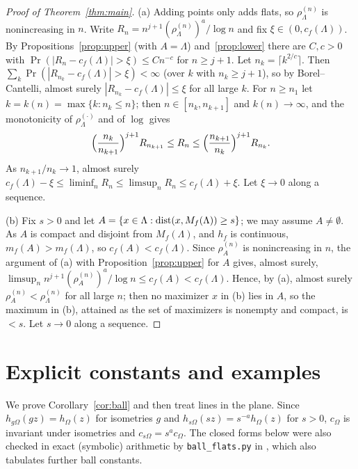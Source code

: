 \documentclass[11pt]{article}
\begin{document}
\begin{proof}[Proof of Theorem~\ref{thm:main}]
(a) Adding points only adds flats, so $\rho_\Lambda^{(n)}$ is nonincreasing in $n$. Write $R_n=n^{j+1}(\rho_\Lambda^{(n)})^a/\log n$ and fix
$\xi\in(0,c_f(\Lambda))$. By Propositions~\ref{prop:upper} (with $A=\Lambda$) and~\ref{prop:lower} there are $C,c>0$ with
$\Pr(|R_n-c_f(\Lambda)|>\xi)\le Cn^{-c}$ for $n\ge j+1$. Let $n_k=\lceil k^{2/c}\rceil$. Then $\sum_k\Pr(|R_{n_k}-c_f(\Lambda)|>\xi)<\infty$ (over
$k$ with $n_k\ge j+1$), so by Borel--Cantelli, almost surely $|R_{n_k}-c_f(\Lambda)|\le\xi$ for all large $k$. For $n\ge n_1$ let
$k=k(n)=\max\{k:n_k\le n\}$; then $n\in[n_k,n_{k+1}]$ and $k(n)\to\infty$, and the monotonicity of $\rho_\Lambda^{(\cdot)}$ and of $\log$
gives
\[
  \Bigl(\frac{n_k}{n_{k+1}}\Bigr)^{j+1}R_{n_{k+1}}\le R_n\le\Bigl(\frac{n_{k+1}}{n_k}\Bigr)^{j+1}R_{n_k}.
\]
As $n_{k+1}/n_k\to1$, almost surely $c_f(\Lambda)-\xi\le\liminf_nR_n\le\limsup_nR_n\le c_f(\Lambda)+\xi$. Let $\xi\to0$ along a sequence.

(b) Fix $s>0$ and let $A=\{x\in\Lambda:\operatorname{dist}(x,M_f(\Lambda))\ge s\}$; we may assume $A\ne\emptyset$. As $A$ is compact and disjoint from
$M_f(\Lambda)$, and $h_f$ is continuous, $m_f(A)>m_f(\Lambda)$, so $c_f(A)<c_f(\Lambda)$. Since $\rho_A^{(n)}$ is nonincreasing in $n$, the argument
of (a) with Proposition~\ref{prop:upper} for $A$ gives, almost surely, $\limsup_nn^{j+1}(\rho_A^{(n)})^a/\log n\le c_f(A)<c_f(\Lambda)$. Hence,
by (a), almost surely $\rho_A^{(n)}<\rho_\Lambda^{(n)}$ for all large $n$; then no maximizer $x$ in (b) lies in $A$, so the maximum in (b), attained as the set of maximizers is nonempty and compact, is
$<s$. Let $s\to0$ along a sequence.
\end{proof}

\section{Explicit constants and examples}\label{sec:examples}

We prove Corollary~\ref{cor:ball} and then treat lines in the plane. Since $h_{g\Omega}(gz)=h_\Omega(z)$ for isometries $g$ and
$h_{s\Omega}(sz)=s^{-a}h_\Omega(z)$ for $s>0$, $c_\Omega$ is invariant under isometries and $c_{s\Omega}=s^ac_\Omega$. The closed forms below were
also checked in exact (symbolic) arithmetic by \texttt{ball\_flats.py} in \cite{Repo}, which also tabulates further ball constants.
\end{document}
